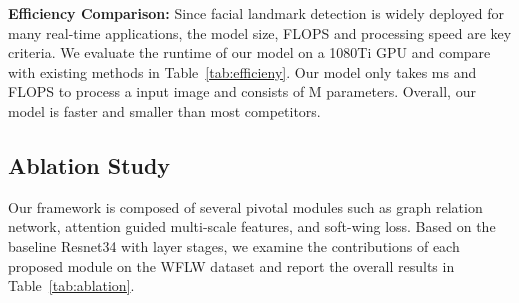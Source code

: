 \documentclass[runningheads]{llncs}
\begin{document}
\textbf{Efficiency Comparison:}
Since facial landmark detection is widely deployed for many real-time applications, the model size, FLOPS and processing speed are key criteria. 
We evaluate the runtime of our model on a 1080Ti GPU and compare with existing methods in Table~\ref{tab:efficieny}.
Our model only takes  ms and  FLOPS to process a  input image and consists of M parameters.
Overall, our model is faster and smaller than most competitors.


\subsection{Ablation Study}
Our framework is composed of several pivotal modules such as graph relation network, attention guided multi-scale features, and soft-wing loss. 
Based on the baseline Resnet34 with  layer stages, we examine the contributions of each proposed module on the WFLW dataset and report the overall results in Table~\ref{tab:ablation}.
\end{document}

